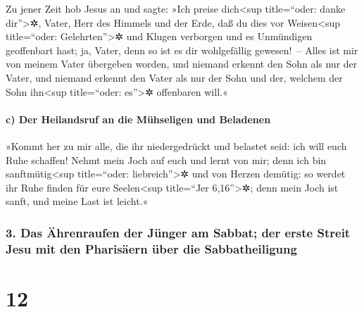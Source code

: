  Zu jener Zeit hob Jesus an und sagte: »Ich preise
dich\textless sup title=``oder: danke dir''\textgreater✲, Vater, Herr
des Himmels und der Erde, daß du dies vor Weisen\textless sup
title=``oder: Gelehrten''\textgreater✲ und Klugen verborgen und es
Unmündigen geoffenbart hast;  ja, Vater, denn so ist es
dir wohlgefällig gewesen!~--  Alles ist mir von meinem
Vater übergeben worden, und niemand erkennt den Sohn als nur der Vater,
und niemand erkennt den Vater als nur der Sohn und der, welchem der Sohn
ihn\textless sup title=``oder: es''\textgreater✲ offenbaren will.«

\hypertarget{c-der-heilandsruf-an-die-muxfchseligen-und-beladenen}{%
\paragraph{c) Der Heilandsruf an die Mühseligen und
Beladenen}\label{c-der-heilandsruf-an-die-muxfchseligen-und-beladenen}}

 »Kommt her zu mir alle, die ihr niedergedrückt und
belastet seid: ich will euch Ruhe schaffen!  Nehmt mein
Joch auf euch und lernt von mir; denn ich bin sanftmütig\textless sup
title=``oder: liebreich''\textgreater✲ und von Herzen demütig: so werdet
ihr Ruhe finden für eure Seelen\textless sup title=``Jer
6,16''\textgreater✲;  denn mein Joch ist sanft, und meine
Last ist leicht.«

\hypertarget{das-uxe4hrenraufen-der-juxfcnger-am-sabbat-der-erste-streit-jesu-mit-den-pharisuxe4ern-uxfcber-die-sabbatheiligung}{%
\subsubsection{3. Das Ährenraufen der Jünger am Sabbat; der erste Streit
Jesu mit den Pharisäern über die
Sabbatheiligung}\label{das-uxe4hrenraufen-der-juxfcnger-am-sabbat-der-erste-streit-jesu-mit-den-pharisuxe4ern-uxfcber-die-sabbatheiligung}}

\hypertarget{section-11}{%
\section{12}\label{section-11}}

